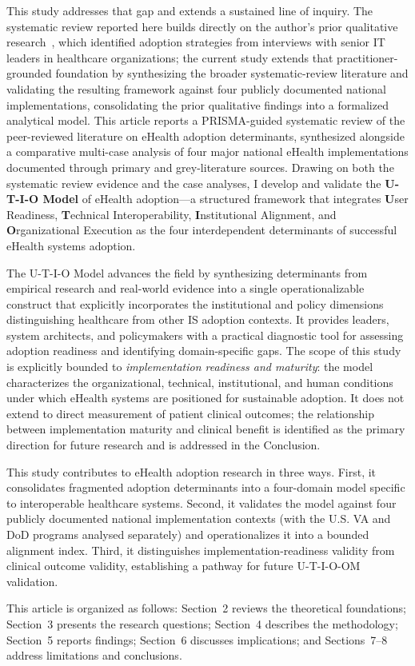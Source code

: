 This study addresses that gap and extends a sustained line of inquiry. The systematic review reported here builds directly on the author's prior qualitative research~\cite{adams2020strategies}, which identified adoption strategies from interviews with senior IT leaders in healthcare organizations; the current study extends that practitioner-grounded foundation by synthesizing the broader systematic-review literature and validating the resulting framework against four publicly documented national implementations, consolidating the prior qualitative findings into a formalized analytical model. This article reports a PRISMA-guided systematic review of the peer-reviewed literature on eHealth adoption determinants, synthesized alongside a comparative multi-case analysis of four major national eHealth implementations documented through primary and grey-literature sources. Drawing on both the systematic review evidence and the case analyses, I develop and validate the \textbf{U-T-I-O Model} of eHealth adoption—a structured framework that integrates \textbf{U}ser Readiness, \textbf{T}echnical Interoperability, \textbf{I}nstitutional Alignment, and \textbf{O}rganizational Execution as the four interdependent determinants of successful eHealth systems adoption.

The U-T-I-O Model advances the field by synthesizing determinants from empirical research and real-world evidence into a single operationalizable construct that explicitly incorporates the institutional and policy dimensions distinguishing healthcare from other IS adoption contexts. It provides leaders, system architects, and policymakers with a practical diagnostic tool for assessing adoption readiness and identifying domain-specific gaps. The scope of this study is explicitly bounded to \textit{implementation readiness and maturity}: the model characterizes the organizational, technical, institutional, and human conditions under which eHealth systems are positioned for sustainable adoption. It does not extend to direct measurement of patient clinical outcomes; the relationship between implementation maturity and clinical benefit is identified as the primary direction for future research and is addressed in the Conclusion.

This study contributes to eHealth adoption research in three ways. First, it consolidates fragmented adoption determinants into a four-domain model specific to interoperable healthcare systems. Second, it validates the model against four publicly documented national implementation contexts (with the U.S. VA and DoD programs analysed separately) and operationalizes it into a bounded alignment index. Third, it distinguishes implementation-readiness validity from clinical outcome validity, establishing a pathway for future U-T-I-O-OM validation.

This article is organized as follows: Section~2 reviews the theoretical foundations; Section~3 presents the research questions; Section~4 describes the methodology; Section~5 reports findings; Section~6 discusses implications; and Sections~7–8 address limitations and conclusions.
